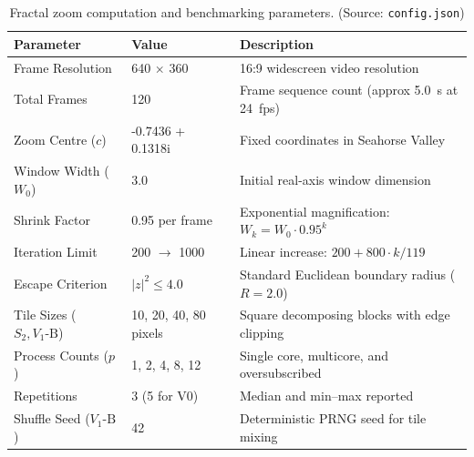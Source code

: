 \begin{table}[htbp]
\centering
\small
\caption{Fractal zoom computation and benchmarking parameters. (Source: \texttt{config.json})}
\label{tab:parameters}
\begin{tabular}{lll}
\toprule
\textbf{Parameter} & \textbf{Value} & \textbf{Description} \\
\midrule
Frame Resolution & 640 $\times$ 360 & 16:9 widescreen video resolution \\
Total Frames & 120 & Frame sequence count (approx 5.0~s at 24~fps) \\
Zoom Centre ($c$) & -0.7436 + 0.1318i & Fixed coordinates in Seahorse Valley \\
Window Width ($W_0$) & 3.0 & Initial real-axis window dimension \\
Shrink Factor & 0.95 per frame & Exponential magnification: $W_k = W_0 \cdot 0.95^k$ \\
Iteration Limit & 200 $\rightarrow$ 1000 & Linear increase: $200 + 800 \cdot k / 119$ \\
Escape Criterion & $|z|^2 \le 4.0$ & Standard Euclidean boundary radius ($R=2.0$) \\
Tile Sizes ($S_2, V_1\text{-B}$) & 10, 20, 40, 80 pixels & Square decomposing blocks with edge clipping \\
Process Counts ($p$) & 1, 2, 4, 8, 12 & Single core, multicore, and oversubscribed \\
Repetitions & 3 (5 for V0) & Median and min--max reported \\
Shuffle Seed ($V_1\text{-B}$) & 42 & Deterministic PRNG seed for tile mixing \\
\bottomrule
\end{tabular}
\end{table}
